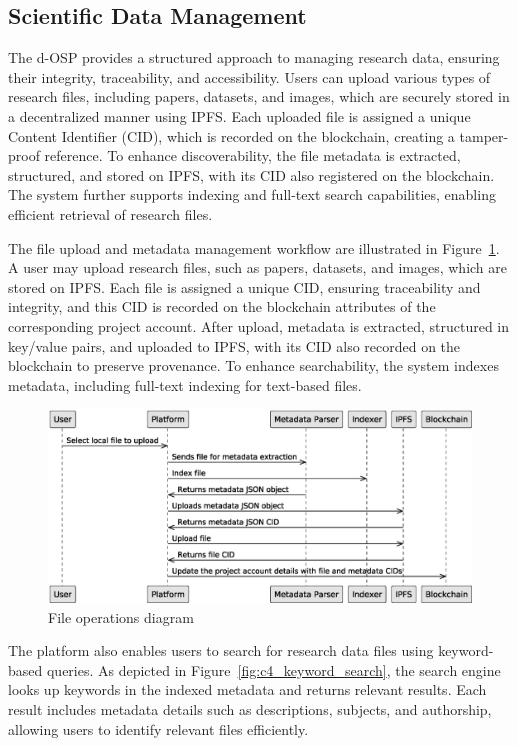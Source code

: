 \documentclass[final]{rc-book-2.14}
\begin{document}
\subsection{Scientific Data Management}

The d-OSP provides a structured approach to managing research data, ensuring their integrity, traceability, and accessibility. Users can upload various types of research files, including papers, datasets, and images, which are securely stored in a decentralized manner using IPFS. Each uploaded file is assigned a unique Content Identifier (CID), which is recorded on the blockchain, creating a tamper-proof reference. To enhance discoverability, the file metadata is extracted, structured, and stored on IPFS, with its CID also registered on the blockchain. The system further supports indexing and full-text search capabilities, enabling efficient retrieval of research files.

The file upload and metadata management workflow are illustrated in Figure~\ref{fig:c4_file_operations_diagram}. A user may upload research files, such as papers, datasets, and images, which are stored on IPFS. Each file is assigned a unique CID, ensuring traceability and integrity, and this CID is recorded on the blockchain attributes of the corresponding project account. After upload, metadata is extracted, structured in key/value pairs, and uploaded to IPFS, with its CID also recorded on the blockchain to preserve provenance. To enhance searchability, the system indexes metadata, including full-text indexing for text-based files.

\begin{figure}[htbp]
    \centering
    \includegraphics[scale=0.5]{fig/c4_platform_operations_2.eps}
    \caption{File operations diagram}
    \label{fig:c4_file_operations_diagram}
\end{figure}

The platform also enables users to search for research data files using keyword-based queries. As depicted in Figure~\ref{fig:c4_keyword_search}, the search engine looks up keywords in the indexed metadata and returns relevant results. Each result includes metadata details such as descriptions, subjects, and authorship, allowing users to identify relevant files efficiently.
\end{document}
